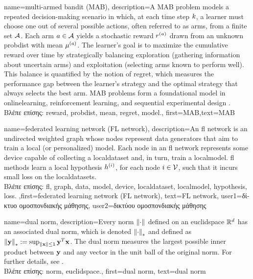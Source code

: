{name={multi-armed bandit (MAB)},
	description={A MAB problem models 
		a repeated decision-making scenario in which, at each time step $k$, a learner must 
		choose one out of several possible actions, often referred to as arms, from a finite 
		set $\mathcal{A}$. Each arm $a \in \mathcal{A}$ yields a stochastic \gls{reward} $r^{(a)}$ 
		drawn from an unknown \gls{probdist} with \gls{mean} $\mu^{(a)}$. 
		The learner’s goal is to maximize the cumulative \gls{reward} over time by 
		strategically balancing exploration (gathering information about 
		uncertain arms) and exploitation (selecting arms known to perform well). 
		This balance is quantified by the notion of \gls{regret}, which measures the performance 
		gap between the learner's strategy and the optimal strategy that always selects the best arm. 
		MAB problems form a foundational \gls{model} in \gls{onlinelearning}, reinforcement learning, 
		and sequential experimental design \cite{Bubeck2012}.\\
		\foreignlanguage{greek}{Βλέπε επίσης:} \gls{reward}, \gls{probdist}, \gls{mean}, \gls{regret}, \gls{model}.},
	first={MAB},text={MAB}
}

{name={federated learning network (FL network)},
	description={An \gls{fl} network is an 
		undirected weighted \gls{graph} whose nodes represent \gls{data} generators that 
		aim to train a local (or personalized) \gls{model}. Each node in an \gls{fl} network 
		represents some \gls{device} capable of collecting a \gls{localdataset} 
		and, in turn, train a \gls{localmodel}. \Gls{fl} methods learn a local \gls{hypothesis} $h^{(i)}$, for 
	    each node $i \in \mathcal{V}$, such that it incurs small \gls{loss} on the \gls{localdataset}s.\\
	    \foreignlanguage{greek}{Βλέπε επίσης:} \gls{fl}, \gls{graph}, \gls{data}, \gls{model}, \gls{device}, \gls{localdataset}, \gls{localmodel}, \gls{hypothesis}, \gls{loss}.
	    },first={federated learning network (FL network)},
	    text={FL network},
	    user1={\foreignlanguage{greek}{δίκτυο ομοσπονδιακής μάθησης}}, %
  	    user2={\foreignlanguage{greek}{δικτύου ομοσπονδιακής μάθησης}} %
}

{name={dual norm},
description={Every \gls{norm} $\left\Vert {\cdot} \right\Vert_{}$ defined on an \gls{euclidspace} $\mathbb{R}^{d}$ 
		has an associated dual \gls{norm}, which is denoted $\left\Vert {\cdot} \right\Vert_{*}$ and defined as 
		$\left\Vert {{\bf y}} \right\Vert_{*} := \sup_{\Vert {{\bf x}} \Vert{} \le 1} {\bf y}^{T} {\bf x}$. 
		The dual \gls{norm} measures the largest possible inner product between ${\bf y}$ 
		and any vector in the unit ball of the original \gls{norm}. For further details, see 
		\cite[Sec.~A.1.6]{BoydConvexBook}.\\
		\foreignlanguage{greek}{Βλέπε επίσης:} \gls{norm}, \gls{euclidspace}.},
	first={dual norm},
	text={dual norm}
}


